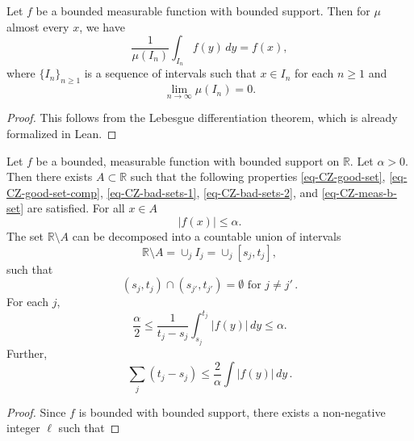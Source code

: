{\begin{lemma}
    \label{lem-Leb-diff-thm}
    Let $f$ be a bounded measurable function with bounded support. Then for $\mu$ almost every $x$, we have
    $$\frac{1}{\mu(I_n)}\int_{I_n} f(y)\, dy= f(x),$$
    where $\{I_n\}_{n\geq 1}$ is a sequence of intervals such that $x\in I_n$ for each $n\geq 1$ and $$\lim_{n\to \infty} \mu(I_n)=0.$$
\end{lemma}
\begin{proof}
    This follows from the Lebesgue differentiation theorem, which is already formalized in Lean.
\end{proof}

\begin{lemma}
   \label{CZD}
   Let $f$ be a bounded, measurable function with bounded support on $\mathbb{R}$. Let $\alpha>0$. Then there exists $A\subset \mathbb{R}$ such that the following properties \eqref{eq-CZ-good-set}, \eqref{eq-CZ-good-set-comp}, \eqref{eq-CZ-bad-sets-1}, \eqref{eq-CZ-bad-sets-2}, and \eqref{eq-CZ-meas-b-set} are satisfied. For all $x\in A$
    \begin{equation}
    \label{eq-CZ-good-set}
        |f(x)|\leq \alpha.
    \end{equation}
    The set $\mathbb{R}\setminus A$ can be decomposed into a countable union of intervals
    \begin{equation}
        \label{eq-CZ-good-set-comp}
        \mathbb{R}\setminus A= \cup_{j} I_j= \cup_{j} [s_j, t_j],
    \end{equation}
    such that
   \begin{equation}
   \label{eq-CZ-bad-sets-1}
    (s_j, t_j)\cap (s_{j'}, t_{j'})=\emptyset \text{ for } j\neq j' \,.
   \end{equation}
   For each $j$,
   \begin{equation}
       \label{eq-CZ-bad-sets-2}
       \frac{\alpha}{2}\leq \frac{1}{t_j-s_j}\int_{s_j}^{t_j} |f(y)|\, dy\leq \alpha.
   \end{equation}
   Further,
   \begin{equation}
       \label{eq-CZ-meas-b-set}
        \sum_{j}(t_j-s_j)\leq \frac{2}{\alpha}\int |f(y)|\, dy\,.
   \end{equation}
\end{lemma}
\begin{proof}
    Since $f$ is bounded with bounded support, there exists a non-negative integer $\ell$ such that

\end{proof}}
